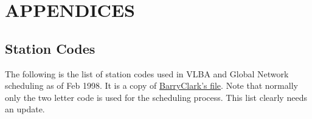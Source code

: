 \documentclass{report}
\begin{document}
\appendix

\chapter{\label{APP:APPENDICES}APPENDICES}


\section{\label{APP:STACODES}Station Codes}

The following is the list of station codes used in VLBA and Global
Network scheduling as of Feb 1998.  It is a copy of
{\href{http://www.aoc.nrao.edu/~bclark/stationcodes.html}{BarryClark's file}}.
Note that normally only the two letter code is used for the
scheduling process.  This list clearly needs an update.
\end{document}
